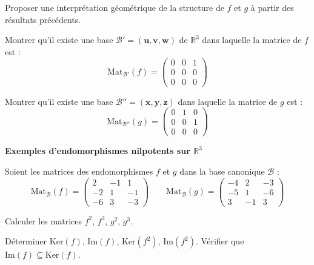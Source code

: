 \documentclass[10pt,a4paper]{article}
\newcommand{\Mat}[2]{\mathrm{Mat}_{#1}(#2)}
\begin{document}
\q Proposer une interprétation géométrique de la structure de $f$ et $g$ à partir des résultats
précédents.

\q Montrer qu'il existe une base $\mathscr{B}' = (\mathbf{u}, \mathbf{v}, \mathbf{w})$ de
$\mathbb{R}^3$ dans laquelle la matrice de $f$ est :
\[
\Mat{\mathscr{B}'}{f} =
\begin{pmatrix}
0 & 0 & 1\\
0 & 0 & 0\\
0 & 0 & 0
\end{pmatrix}
\]

\q Montrer qu'il existe une base $\mathscr{B}'' = (\mathbf{x}, \mathbf{y}, \mathbf{z})$ dans
laquelle la matrice de $g$ est :
\[
\Mat{\mathscr{B}''}{g} =
\begin{pmatrix}
0 & 1 & 0\\
0 & 0 & 1\\
0 & 0 & 0
\end{pmatrix}
\]

\bigskip
\textbf{Exemples d'endomorphismes nilpotents sur $\mathbb{R}^3$}

Soient les matrices des endomorphismes $f$ et $g$ dans la base canonique $\mathscr{B}$ :
\[
\Mat{\mathscr{B}}{f} =
\begin{pmatrix}
2 & -1 & 1\\
-2 & 1 & -1\\
-6 & 3 & -3
\end{pmatrix}
\qquad
\Mat{\mathscr{B}}{g} =
\begin{pmatrix}
-4 & 2 & -3\\
-5 & 1 & -6\\
3 & -1 & 3
\end{pmatrix}
\]

\q Calculer les matrices $f^2$, $f^3$, $g^2$, $g^3$.

\q Déterminer $\mathrm{Ker}(f)$, $\mathrm{Im}(f)$, $\mathrm{Ker}(f^2)$, $\mathrm{Im}(f^2)$. Vérifier
que $\mathrm{Im}(f) \subseteq \mathrm{Ker}(f)$.
\end{document}
